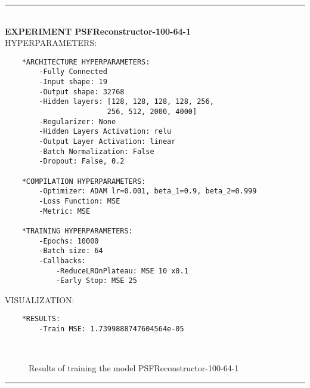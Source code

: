 \rule{0.5\textwidth}{0.5pt}\\

	{\large \textbf{EXPERIMENT PSFReconstructor-100-64-1}}\\
	
	{\normalsize HYPERPARAMETERS:}
	\begin{lstlisting}
	*ARCHITECTURE HYPERPARAMETERS:
		-Fully Connected
		-Input shape: 19
		-Output shape: 32768
		-Hidden layers: [128, 128, 128, 128, 256,
						256, 512, 2000, 4000]
		-Regularizer: None
		-Hidden Layers Activation: relu
		-Output Layer Activation: linear
		-Batch Normalization: False
		-Dropout: False, 0.2
	
	*COMPILATION HYPERPARAMETERS:
		-Optimizer: ADAM lr=0.001, beta_1=0.9, beta_2=0.999
		-Loss Function: MSE
		-Metric: MSE
	
	*TRAINING HYPERPARAMETERS:
		-Epochs: 10000
		-Batch size: 64
		-Callbacks: 
			-ReduceLROnPlateau: MSE 10 x0.1
			-Early Stop: MSE 25
	\end{lstlisting}
	
	{\normalsize VISUALIZATION:}
	\begin{lstlisting}
	*RESULTS:
        -Train MSE: 1.7399888747604564e-05
	\end{lstlisting}
	
	\begin{figure*}[ht!]
		\hspace{\fill}
		\hspace{\fill}	
		\\
		\caption{Results of training the model PSFReconstructor-100-64-1}
	\end{figure*}
	
\FloatBarrier	
\rule{0.5\textwidth}{0.5pt}\\